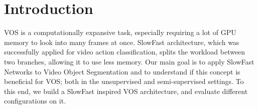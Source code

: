 \section{Introduction}
VOS is a computationally expansive task, especially requiring a lot of GPU memory to look into many frames at once. SlowFast architecture, which was successfully applied for video action classification, splits the workload between two branches, allowing it to use less memory. 
Our main goal is to apply SlowFast Networks
 to Video Object Segmentation and to understand if this concept is beneficial for VOS; both in the unsupervised and semi-supervised settings. To this end, we build a SlowFast inspired VOS architecture, and evaluate different configurations on it.
